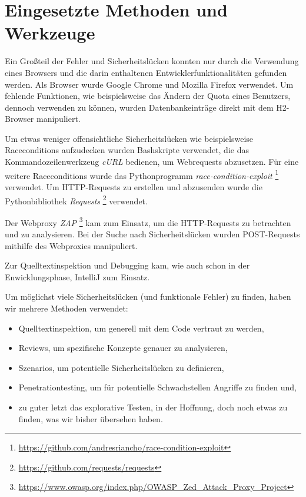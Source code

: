 \documentclass[12pt,DIV14,BCOR10mm,a4paper,parskip=half-,headsepline,headinclude,english,ngerman,bibliography=totocnumbered]{scrreprt}
\begin{document}
\chapter{Eingesetzte Methoden und Werkzeuge}

Ein Großteil der Fehler und Sicherheitslücken konnten nur durch die Verwendung eines Browsers und die darin enthaltenen Entwicklerfunktionalitäten gefunden werden. Als Browser wurde Google Chrome und Mozilla Firefox verwendet. Um fehlende Funktionen, wie beispielsweise das Ändern der Quota eines Benutzers, dennoch verwenden zu können, wurden Datenbankeinträge direkt mit dem H2-Browser manipuliert.

Um etwas weniger offensichtliche Sicherheitslücken wie beispielsweise Raceconditions aufzudecken wurden Bashskripte verwendet, die das Kommandozeilenwerkzeug \textit{cURL} bedienen, um Webrequests abzusetzen. Für eine weitere Raceconditions wurde das Pythonprogramm \textit{race-condition-exploit} \footnote{\url{https://github.com/andresriancho/race-condition-exploit}} verwendet. Um HTTP-Requests zu erstellen und abzusenden wurde die Pythonbibliothek \textit{Requests} \footnote{\url{https://github.com/requests/requests}} verwendet.

Der Webproxy \textit{ZAP} \footnote{\url{https://www.owasp.org/index.php/OWASP_Zed_Attack_Proxy_Project}} kam zum Einsatz, um die HTTP-Requests zu betrachten und zu analysieren. Bei der Suche nach Sicherheitslücken wurden POST-Requests mithilfe des Webproxies manipuliert.

Zur Quelltextinspektion und Debugging kam, wie auch schon in der Enwicklungsphase, IntelliJ zum Einsatz.

Um möglichst viele Sicherheitslücken (und funktionale Fehler) zu finden, haben wir mehrere Methoden verwendet:

\begin{itemize}
  \item Quelltextinspektion, um generell mit dem Code vertraut zu werden,
  \item Reviews, um spezifische Konzepte genauer zu analysieren,
  \item Szenarios, um potentielle Sicherheitslücken zu definieren,
  \item Penetrationtesting, um für potentielle Schwachstellen Angriffe zu finden und,
  \item zu guter letzt das explorative Testen, in der Hoffnung, doch noch etwas zu finden, was wir bisher übersehen haben.
\end{itemize}
\end{document}
